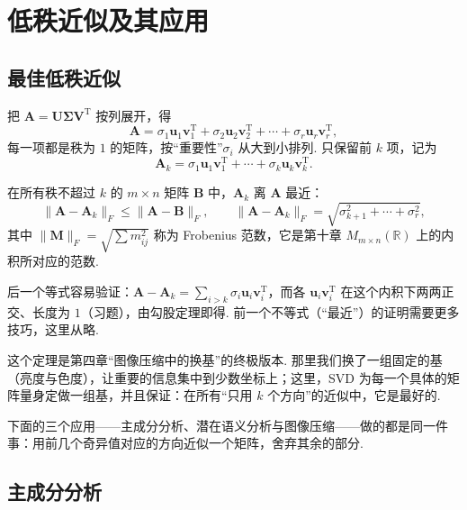 \documentclass[lang=cn,10.5pt,scheme=chinese,toc=twocol,section,chinesefont=nofont,
twoside,citestyle=gb7714-2015,bibstyle=gb7714-2015]{elegantbook}
\DeclareRobustCommand{\textbf}[1]{{\lnsemiboldlatin\lnsemiboldcjk #1}}
\newcommand{\vv}[1]{\boldsymbol{#1}}
\newcommand{\trans}{\mathrm{T}}             %
\numberwithin{equation}{section}   %
\newcommand{\hC}{\texorpdfstring{\textdaggerdbl}{‡}}
\begin{document}
\section{\hC 低秩近似及其应用}

\subsection{最佳低秩近似}

把 $\vv A=\vv U\vv\Sigma\vv V^\trans$ 按列展开，得
\[\vv A=\sigma_1\vv u_1\vv v_1^\trans+\sigma_2\vv u_2\vv v_2^\trans+\cdots+\sigma_r\vv u_r\vv v_r^\trans,\]
每一项都是秩为 $1$ 的矩阵，按“重要性”$\sigma_i$ 从大到小排列. 只保留前 $k$ 项，记为
\[\vv A_k=\sigma_1\vv u_1\vv v_1^\trans+\cdots+\sigma_k\vv u_k\vv v_k^\trans.\]

\begin{theorem}\label{thm:eckartyoung}
  在所有秩不超过 $k$ 的 $m\times n$ 矩阵 $\vv B$ 中，$\vv A_k$ 离 $\vv A$ 最近：
  \[\|\vv A-\vv A_k\|_F\le\|\vv A-\vv B\|_F,\qquad \|\vv A-\vv A_k\|_F=\sqrt{\sigma_{k+1}^2+\cdots+\sigma_r^2},\]
  其中 $\|\vv M\|_F=\sqrt{\sum m_{ij}^2}$ 称为 \textbf{Frobenius 范数}，它是第十章 $M_{m\times n}(\mathbb{R})$ 上的内积所对应的范数.
\end{theorem}

后一个等式容易验证：$\vv A-\vv A_k=\sum_{i>k}\sigma_i\vv u_i\vv v_i^\trans$，而各 $\vv u_i\vv v_i^\trans$ 在这个内积下两两正交、长度为 $1$（习题），由勾股定理即得. 前一个不等式（“最近”）的证明需要更多技巧，这里从略.

\begin{motivebox}
  这个定理是第四章“图像压缩中的换基”的终极版本. 那里我们换了一组固定的基（亮度与色度），让重要的信息集中到少数坐标上；这里，SVD 为\textbf{每一个具体的矩阵}量身定做一组基，并且保证：在所有“只用 $k$ 个方向”的近似中，它是最好的.
\end{motivebox}

下面的三个应用——主成分分析、潜在语义分析与图像压缩——做的都是同一件事：用前几个奇异值对应的方向近似一个矩阵，舍弃其余的部分.

\subsection{主成分分析}
\end{document}
